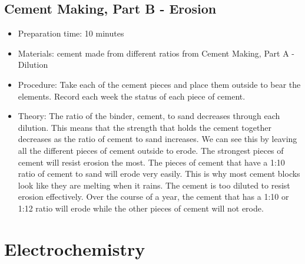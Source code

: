 \subsection{Cement Making, Part B - Erosion}
\begin{itemize}
\item{Preparation time: 10 minutes}
\item{Materials: cement made from different ratios from Cement Making, Part A - Dilution}
\item{Procedure: Take each of the cement pieces and place them outside to bear the elements. Record each week the status of each piece of cement.}
\item{Theory: The ratio of the binder, cement, to sand decreases through each dilution. This means that the strength that holds the cement together decreases as the ratio of cement to sand increases. We can see this by leaving all the different pieces of cement outside to erode. The strongest pieces of cement will resist erosion the most. The pieces of cement that have a 1:10 ratio of cement to sand will erode very easily. This is why most cement blocks look like they are melting when it rains. The cement is too diluted to resist erosion effectively. Over the course of a year, the cement that has a 1:10 or 1:12 ratio will erode while the other pieces of cement will not erode.}
\end{itemize}

\section{Electrochemistry}

